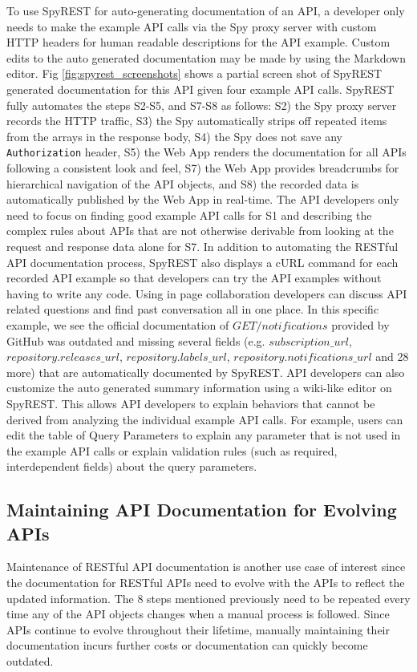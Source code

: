 To use SpyREST for auto-generating documentation of an API, a developer only needs to make the example API calls via the Spy proxy server with custom HTTP headers for human readable descriptions for the API example. Custom edits to the auto generated documentation may be made by using the Markdown editor. Fig \ref{fig:spyrest_screenshots} shows a partial screen shot of SpyREST generated documentation for this API given four example API calls. SpyREST fully automates the steps S2-S5, and S7-S8 as follows: S2) the Spy proxy server records the HTTP traffic, S3) the Spy automatically strips off repeated items from the arrays in the response body, S4) the Spy does not save any \texttt{Authorization} header, S5) the Web App renders the documentation for all APIs following a consistent look and feel, S7) the Web App provides breadcrumbs for hierarchical navigation of the API objects, and S8) the recorded data is automatically published by the Web App in real-time. The API developers only need to focus on finding good example API calls for S1 and describing the complex rules about APIs that are not otherwise derivable from looking at the request and response data alone for S7. In addition to automating the RESTful API documentation process, SpyREST also displays a cURL command for each recorded API example so that developers can try the API examples without having to write any code. Using in page collaboration developers can discuss API related questions and find past conversation all in one place. In this specific example, we see the official documentation of $GET /notifications$ provided by GitHub was outdated and missing several fields (e.g. $subscription\_url$, $repository.releases\_url$, $repository.labels\_url$, $repository.notifications\_url$ and 28 more) that are automatically documented by SpyREST. API developers can also customize the auto generated summary information using a wiki-like editor on SpyREST. This allows API developers to explain behaviors that cannot be derived from analyzing the individual example API calls. For example, users can edit the table of Query Parameters to explain any parameter that is not used in the example API calls or explain validation rules (such as required, interdependent fields) about the query parameters.

\subsection{Maintaining API Documentation for Evolving APIs} %
Maintenance of RESTful API documentation is another use case of interest since the documentation for RESTful APIs need to evolve with the APIs to reflect the updated information. The 8 steps mentioned previously need to be repeated every time any of the API objects changes when a manual process is followed. Since APIs continue to evolve throughout their lifetime, manually maintaining their documentation incurs further costs or documentation can quickly become outdated.

